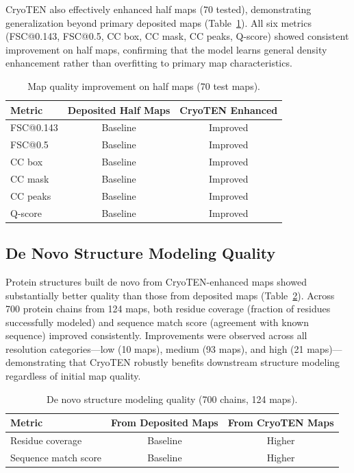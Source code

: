 \documentclass[11pt]{article}
\begin{document}
CryoTEN also effectively enhanced half maps (70 tested), demonstrating generalization beyond primary deposited maps (Table~\ref{tab:halfmaps}). All six metrics (FSC@0.143, FSC@0.5, CC box, CC mask, CC peaks, Q-score) showed consistent improvement on half maps, confirming that the model learns general density enhancement rather than overfitting to primary map characteristics.

\begin{table}[H]
\centering
\caption{Map quality improvement on half maps (70 test maps).}
\label{tab:halfmaps}
\begin{tabular}{lcc}
\toprule
Metric & Deposited Half Maps & CryoTEN Enhanced \\
\midrule
FSC@0.143 & Baseline & Improved \\
FSC@0.5 & Baseline & Improved \\
CC box & Baseline & Improved \\
CC mask & Baseline & Improved \\
CC peaks & Baseline & Improved \\
Q-score & Baseline & Improved \\
\bottomrule
\end{tabular}
\end{table}

\subsection{De Novo Structure Modeling Quality}

Protein structures built de novo from CryoTEN-enhanced maps showed substantially better quality than those from deposited maps (Table~\ref{tab:denovo}). Across 700 protein chains from 124 maps, both residue coverage (fraction of residues successfully modeled) and sequence match score (agreement with known sequence) improved consistently. Improvements were observed across all resolution categories---low (10 maps), medium (93 maps), and high (21 maps)---demonstrating that CryoTEN robustly benefits downstream structure modeling regardless of initial map quality.

\begin{table}[H]
\centering
\caption{De novo structure modeling quality (700 chains, 124 maps).}
\label{tab:denovo}
\begin{tabular}{lcc}
\toprule
Metric & From Deposited Maps & From CryoTEN Maps \\
\midrule
Residue coverage & Baseline & Higher \\
Sequence match score & Baseline & Higher \\
\bottomrule
\end{tabular}
\end{table}
\end{document}
